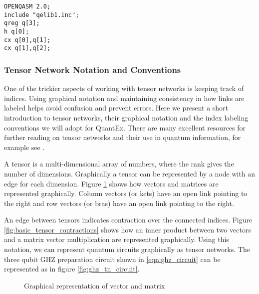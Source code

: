 \begin{minipage}{\linewidth}
\begin{lstlisting}[caption={QASM for three qubit GHZ preparation},label={lst:ghz_qasm}]
OPENQASM 2.0;
include "qelib1.inc";
qreg q[3];
h q[0];
cx q[0],q[1];
cx q[1],q[2];
\end{lstlisting}
\end{minipage}

\subsubsection{Tensor Network Notation and Conventions}
One of the trickier aspects of working with tensor networks is keeping track of
indices. Using graphical notation and maintaining consistency in how links
are labeled helps avoid confusion and prevent errors. Here we
present a short introduction to tensor networks, their graphical notation and
the index labeling conventions we will adopt for QuantEx. There are many
excellent resources for further reading on tensor networks and their use in
quantum information, for example see \cite{biamonte2017tensor, Bridgeman_2017, wood2011tensor}.

A tensor is a multi-dimensional array of numbers, where the rank gives the
number of dimensions. Graphically a tensor can be represented by a node with an
edge for each dimension. Figure \ref{fig:vector_matrix_tensors} shows how
vectors and matrices are represented graphically. Column vectors (or kets) have
an open link pointing to the right and row vectors (or bras) have an open link
pointing to the right.

An edge between tensors indicates contraction over the connected indices. Figure
\ref{fig:basic_tensor_contractions} shows how an inner product between two
vectors and a matrix vector multiplication are represented graphically. Using
this notation, we can represent quantum circuits graphically as tensor
networks. The three qubit GHZ preparation circuit shown in \ref{eqn:ghz_circuit}
can be represented as in figure \ref{fig:ghz_tn_circuit}.

\begin{figure}\label{fig:vector_matrix_tensors}
\centering
{}
\caption{Graphical representation of vector and matrix}
\end{figure}

